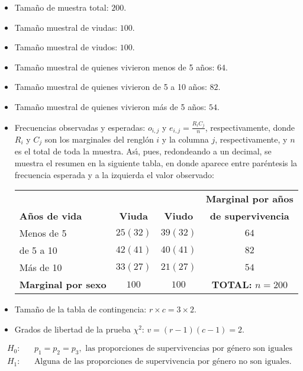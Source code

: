 \begin{solucion}
 \begin{datos}
  $\phantom{0}$
  \begin{itemize}
   \item Tamaño de muestra total: $200$.
   \item Tama\~no muestral de viudas: $100$.
   \item Tama\~no muestral de viudos: $100$.
   \item Tama\~no muestral de quienes vivieron menos de 5 a\~nos: $64$.
   \item Tama\~no muestral de quienes vivieron de 5 a 10 a\~nos: $82$.
   \item Tama\~no muestral de quienes vivieron m\'as de 5 a\~nos: $54$.
   \item Frecuencias observadas y esperadas: $o_{i,j}$
   y $e_{i,j}=\frac{R_i C_j}{n}$, respectivamente,
   donde $R_i$ y $C_j$ son los marginales del rengl\'on $i$ y la columna $j$,
   respectivamente, y $n$ es el total de toda la muestra.
   As\'{\i}, pues, redondeando a un decimal, se muestra el resumen 
   en la siguiente tabla,
   en donde aparece entre par\'entesis la frecuencia esperada
   y a la izquierda el valor observado:
   \begin{center}
    \begin{tabular}{lcc|c}
     & & & \textbf{Marginal por a\~nos} \\
     \textbf{A\~nos de vida} & \textbf{Viuda} & \textbf{Viudo} &
     \textbf{de supervivencia} \\
     \hline
     Menos de 5 & $25 (32)$ & $39 (32)$ & $64$ \\
     de 5 a 10 & $42 (41)$ & $40 (41)$ & $82$ \\
     M\'as de 10 & $33 (27)$ & $21 (27)$ & $54$ \\
     \textbf{Marginal por sexo} & $100$ & $100$ & \textbf{TOTAL:} $n=200$
    \end{tabular}
   \end{center}
   \item Tama\~no de la tabla de contingencia: $r\times c = 3\times 2$.
   \item Grados de libertad de la prueba $\chi^2$: $v = (r-1)(c-1) = 2$.
  \end{itemize}
 \end{datos}
 
 \begin{hipotesis}
  \begin{eqnarray*}
   H_0: & & p_1 = p_2 = p_3,
   \text{ las proporciones de supervivencias por g\'enero son iguales} \\
   H_1: & & \text{Alguna de las proporciones de supervivencia por g\'enero
   no son iguales.}
  \end{eqnarray*}
 \end{hipotesis}


\end{solucion}

